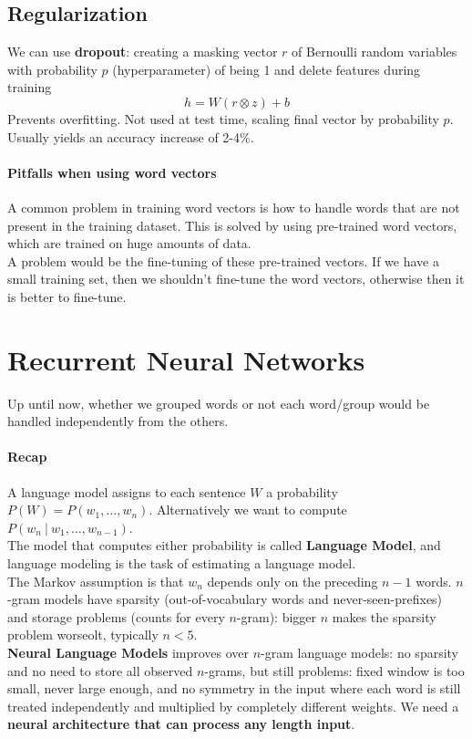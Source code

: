 \documentclass[10pt]{report}
\begin{document}
\subsection{Regularization} 
We can use \textbf{dropout}: creating a masking vector $r$ of Bernoulli random variables with probability $p$ (hyperparameter) of being 1 and delete features during training $$h = W(r\otimes z) + b$$
Prevents overfitting. Not used at test time, scaling final vector by probability $p$. Usually yields an accuracy increase of 2-4\%.
\paragraph{Pitfalls when using word vectors} A common problem in training word vectors is how to handle words that are not present in the training dataset. This is solved by using pre-trained word vectors, which are trained on huge amounts of data.\\
A problem would be the fine-tuning of these pre-trained vectors. If we have a small training set, then we shouldn't fine-tune the word vectors, otherwise then it is better to fine-tune.
\section{Recurrent Neural Networks}
Up until now, whether we grouped words or not each word/group would be handled independently from the others.
\paragraph{Recap} A language model assigns to each sentence $W$ a probability $P(W) = P(w_1,\ldots,w_n)$. Alternatively we want to compute $P(w_n\:|\:w_1,\ldots,w_{n-1})$.\\
The model that computes either probability is called \textbf{Language Model}, and language modeling is the task of estimating a language model.\\
The Markov assumption is that $w_n$ depends only on the preceding $n-1$ words. $n$-gram models have sparsity (out-of-vocabulary words and never-seen-prefixes) and storage problems (counts for every $n$-gram): bigger $n$ makes the sparsity problem worseolt, typically $n<5$.\\
\textbf{Neural Language Models} improves over $n$-gram language models: no sparsity and no need to store all observed $n$-grams, but still problems: fixed window is too small, never large enough, and no symmetry in the input where each word is still treated independently and multiplied by completely different weights. We need a \textbf{neural architecture that can process any length input}.
\end{document}
